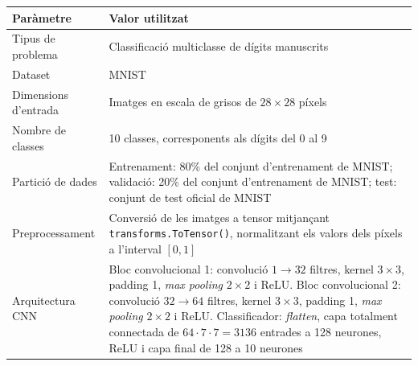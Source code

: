 \documentclass[a4paper,11pt, titlepage, twoside]{article}
\begin{document}
\begin{appendices}
	\begin{table}[H]
		\centering
		\small

		\begin{tabular}{p{4.2cm} p{8.5cm}}
			\hline
			\textbf{Paràmetre} & \textbf{Valor utilitzat}                                                                                                                           \\
			\hline

			Tipus de problema
			                   & Classificació multiclasse de dígits manuscrits                                                                                                     \\

			Dataset
			                   & MNIST                                                                                                                                              \\

			Dimensions d'entrada
			                   & Imatges en escala de grisos de $28 \times 28$ píxels                                                                                               \\

			Nombre de classes
			                   & 10 classes, corresponents als dígits del 0 al 9                                                                                                    \\

			Partició de dades
			                   & Entrenament: 80\% del conjunt d'entrenament de MNIST; validació: 20\% del conjunt d'entrenament de MNIST; test: conjunt de test oficial de MNIST   \\

			Preprocessament
			                   & Conversió de les imatges a tensor mitjançant \texttt{transforms.ToTensor()}, normalitzant els valors dels píxels a l'interval $[0,1]$              \\

			Arquitectura CNN
			                   &
			Bloc convolucional 1: convolució $1 \rightarrow 32$ filtres, kernel $3 \times 3$, padding 1, \textit{max pooling} $2 \times 2$ i ReLU.
			Bloc convolucional 2: convolució $32 \rightarrow 64$ filtres, kernel $3 \times 3$, padding 1, \textit{max pooling} $2 \times 2$ i ReLU.
			Classificador: \textit{flatten}, capa totalment connectada de $64 \cdot 7 \cdot 7 = 3136$ entrades a 128 neurones, ReLU i capa final de 128 a 10 neurones               \\


\end{tabular}
\end{table}
\end{appendices}
\end{document}
